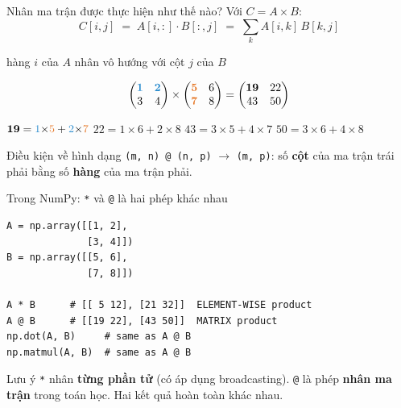 \documentclass[11pt]{beamer}
\begin{document}
\begin{frame}{Nhân ma trận được thực hiện như thế nào?}
Với $C = A \times B$:
\[
  C[i, j] \;=\; A[i, :] \cdot B[:, j] \;=\; \sum_{k} A[i, k] \, B[k, j]
\]
\centerline{\small hàng $i$ của $A$ nhân vô hướng với cột $j$ của $B$}
\[
  \begin{pmatrix} \textcolor{npD}{\mathbf{1}} & \textcolor{npD}{\mathbf{2}} \\ 3 & 4 \end{pmatrix}
  \times
  \begin{pmatrix} \textcolor{npWarn}{\mathbf{5}} & 6 \\ \textcolor{npWarn}{\mathbf{7}} & 8 \end{pmatrix}
  =
  \begin{pmatrix} \mathbf{19} & 22 \\ 43 & 50 \end{pmatrix}
\]
\begin{center}
\small
$\mathbf{19} = \textcolor{npD}{1}{\times}\textcolor{npWarn}{5} + \textcolor{npD}{2}{\times}\textcolor{npWarn}{7}$
\qquad $22 = 1{\times}6 + 2{\times}8$
\qquad $43 = 3{\times}5 + 4{\times}7$
\qquad $50 = 3{\times}6 + 4{\times}8$
\end{center}
\begin{block}{Điều kiện về hình dạng}
\texttt{(m, n) @ (n, p)} $\to$ \texttt{(m, p)}: số \textbf{cột} của ma trận trái phải bằng số \textbf{hàng} của ma trận phải.
\end{block}
\end{frame}

\begin{frame}[fragile]{Trong NumPy: \texttt{*} và \texttt{@} là hai phép khác nhau}
\begin{lstlisting}
A = np.array([[1, 2],
              [3, 4]])
B = np.array([[5, 6],
              [7, 8]])

A * B      # [[ 5 12], [21 32]]  ELEMENT-WISE product
A @ B      # [[19 22], [43 50]]  MATRIX product
np.dot(A, B)     # same as A @ B
np.matmul(A, B)  # same as A @ B
\end{lstlisting}
\begin{alertblock}{Lưu ý}
\texttt{*} nhân \textbf{từng phần tử} (có áp dụng broadcasting).
\texttt{@} là phép \textbf{nhân ma trận} trong toán học. Hai kết quả hoàn toàn khác nhau.
\end{alertblock}
\end{frame}
\end{document}
